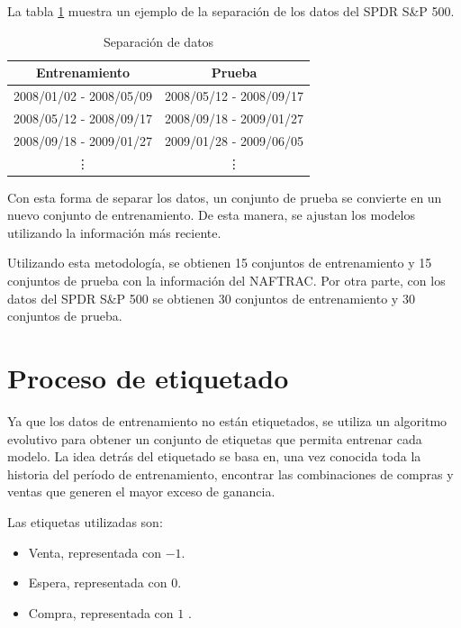 \documentclass[12pt]{report}
\theoremstyle{break}
\theoremstyle{break}
\begin{document}
La tabla \ref{tabla:data split SP500} muestra un ejemplo de la separación de los datos del SPDR S\&P 500.
\begin{table}[h]
\centering
\begin{tabular}{cc}
\hline
\textbf{Entrenamiento} & \textbf{Prueba} \\
\hline
2008/01/02 - 2008/05/09 & 2008/05/12 - 2008/09/17 \\
2008/05/12 - 2008/09/17 & 2008/09/18 - 2009/01/27 \\
2008/09/18 - 2009/01/27 & 2009/01/28 - 2009/06/05 \\
\vdots & \vdots \\
\hline
\end{tabular}
\caption{\label{tabla:data split SP500} Separación de datos}
\end{table}

Con esta forma de separar los datos, un conjunto de prueba se convierte en un nuevo conjunto de entrenamiento. De esta manera, se ajustan los modelos utilizando la información más reciente.

Utilizando esta metodología, se obtienen 15 conjuntos de entrenamiento y 15 conjuntos de prueba con la información del NAFTRAC. Por otra parte, con los datos del SPDR S\&P 500 se obtienen 30 conjuntos de entrenamiento y 30 conjuntos de prueba.

\section{Proceso de etiquetado}
\label{seccion:proceso etiquetado}
Ya que los datos de entrenamiento no están etiquetados, se utiliza un algoritmo evolutivo para obtener un conjunto de etiquetas que permita entrenar cada modelo. La idea detrás del etiquetado se basa en, una vez conocida toda la historia del período de entrenamiento, encontrar las combinaciones de compras y ventas que generen el mayor exceso de ganancia.

Las etiquetas utilizadas son:
\begin{itemize}
\item Venta, representada con $-1$.

\item Espera, representada con $0$.

\item Compra, representada con $1$ .
\end{itemize}
\end{document}
